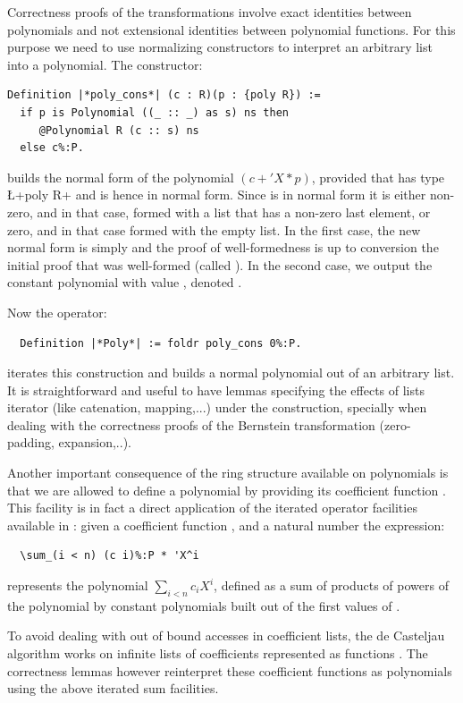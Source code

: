 \documentclass{mscs}
\begin{document}
Correctness proofs  of the transformations involve exact identities
between polynomials and not extensional identities between polynomial
functions. For this purpose we need to use normalizing constructors to
interpret an arbitrary list into a polynomial. The constructor:

\begin{lstlisting}
Definition |*poly_cons*| (c : R)(p : {poly R}) :=
  if p is Polynomial ((_ :: _) as s) ns then
     @Polynomial R (c :: s) ns
  else c%:P.
\end{lstlisting}
builds the normal form of the polynomial $(c + 'X*p)$, provided that
 has type \L+{poly R}+ and is hence in normal form. Since 
is in normal form it is either non-zero, and in that case, formed with
a list  that has a non-zero last element, or zero, and in that case formed
with the empty list. In the first case, the new normal form is simply
 and the proof of well-formedness is up to conversion the
initial proof that  was well-formed (called ). In the second case, we
output the constant polynomial with value , denoted .

Now the operator:
\begin{lstlisting}
  Definition |*Poly*| := foldr poly_cons 0%:P.
\end{lstlisting}
iterates this construction and builds a normal polynomial out of an
arbitrary list. It is straightforward and useful to have lemmas
specifying the effects of lists iterator (like catenation,
mapping,...) under the  construction, specially when dealing
with the correctness proofs of the Bernstein transformation
(zero-padding, expansion,..).

Another important consequence of the ring structure available on
polynomials is that we are allowed to
define a polynomial by providing its coefficient function
. This facility is
in fact a direct application of the iterated operator facilities
available in \ssr{} \cite{bigops}: given a coefficient function
, and a natural number  the expression:
\begin{lstlisting}
  \sum_(i < n) (c i)%:P * 'X^i
\end{lstlisting}
represents the polynomial $\sum_{i < n}c_i X^i$, defined as a sum of
products of powers of the polynomial  by constant polynomials
built out of the first values of .

To avoid dealing with out of bound accesses in coefficient lists, the
de Casteljau algorithm works on infinite lists of coefficients
represented as functions . The correctness lemmas
however reinterpret these coefficient functions as polynomials using
the above iterated sum facilities.
\end{document}

